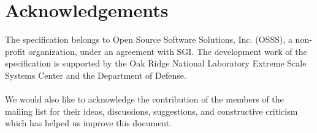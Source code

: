 \date{\today}

\section*{Acknowledgements}
The \openshmem specification belongs to Open Source Software Solutions, Inc.
(OSSS), a non-profit organization, under an agreement with SGI. The development
work of the specification is supported by the Oak Ridge National Laboratory
Extreme Scale Systems Center and the Department of Defense.\\
\\
We would also like to acknowledge the contribution of the members of the
\openshmem mailing list for their ideas, discussions, suggestions, and
constructive criticism which has helped us improve this document.


